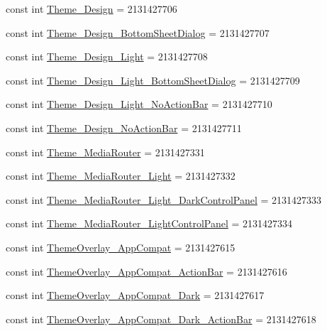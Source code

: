 \begin{CompactItemize}
\item 
const int \hyperlink{class__2doo_1_1_droid_1_1_resource_1_1_style_0c3d3f264c0ec4345e6bfabc4f331462}{Theme\_\-Design} = 2131427706
\item 
const int \hyperlink{class__2doo_1_1_droid_1_1_resource_1_1_style_7f79cbee5345007eeba66b709c4f6577}{Theme\_\-Design\_\-BottomSheetDialog} = 2131427707
\item 
const int \hyperlink{class__2doo_1_1_droid_1_1_resource_1_1_style_8ff60b7659c0b98b631850664c70b859}{Theme\_\-Design\_\-Light} = 2131427708
\item 
const int \hyperlink{class__2doo_1_1_droid_1_1_resource_1_1_style_a8bc94597dfbeb5b4c9e8015d39d7e46}{Theme\_\-Design\_\-Light\_\-BottomSheetDialog} = 2131427709
\item 
const int \hyperlink{class__2doo_1_1_droid_1_1_resource_1_1_style_d82f7376d870363619ac98e4828dffee}{Theme\_\-Design\_\-Light\_\-NoActionBar} = 2131427710
\item 
const int \hyperlink{class__2doo_1_1_droid_1_1_resource_1_1_style_69ce3c6e0163473c9141d1b4a1dc4336}{Theme\_\-Design\_\-NoActionBar} = 2131427711
\item 
const int \hyperlink{class__2doo_1_1_droid_1_1_resource_1_1_style_de6e8ed0cee7f4682cdc67b11e2f2cd7}{Theme\_\-MediaRouter} = 2131427331
\item 
const int \hyperlink{class__2doo_1_1_droid_1_1_resource_1_1_style_b11d7bf7457bf8ab2a3219f48cbb3c39}{Theme\_\-MediaRouter\_\-Light} = 2131427332
\item 
const int \hyperlink{class__2doo_1_1_droid_1_1_resource_1_1_style_e0de72a30b455af72fd83ebb123c4217}{Theme\_\-MediaRouter\_\-Light\_\-DarkControlPanel} = 2131427333
\item 
const int \hyperlink{class__2doo_1_1_droid_1_1_resource_1_1_style_570cc8092f1d260245fe77fbcee70ca6}{Theme\_\-MediaRouter\_\-LightControlPanel} = 2131427334
\item 
const int \hyperlink{class__2doo_1_1_droid_1_1_resource_1_1_style_7bf0cd835abcd6d98849500bcdbca8bb}{ThemeOverlay\_\-AppCompat} = 2131427615
\item 
const int \hyperlink{class__2doo_1_1_droid_1_1_resource_1_1_style_9daa81c76c9b0a7bb2d998447565eff1}{ThemeOverlay\_\-AppCompat\_\-ActionBar} = 2131427616
\item 
const int \hyperlink{class__2doo_1_1_droid_1_1_resource_1_1_style_4969f251d1765b55a0332531097fc089}{ThemeOverlay\_\-AppCompat\_\-Dark} = 2131427617
\item 
const int \hyperlink{class__2doo_1_1_droid_1_1_resource_1_1_style_b5afde6f53baf5a87fb8df4f6cd4cd7d}{ThemeOverlay\_\-AppCompat\_\-Dark\_\-ActionBar} = 2131427618

\end{CompactItemize}
